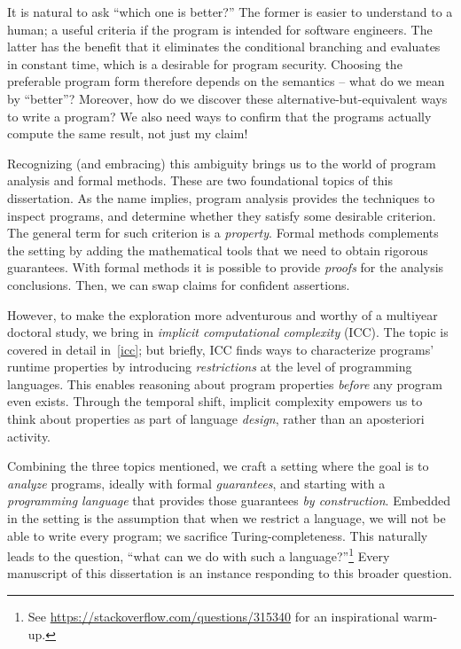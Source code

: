 It is natural to ask \enquote{which one is better?}
The former is {easier} to understand {to a human};
a useful criteria if the program is intended for software engineers.
The latter has the benefit that it eliminates the conditional branching and evaluates in {constant time}, which is a desirable for program security.
Choosing the preferable program form therefore depends on the semantics -- what do we mean by \enquote{better}?
Moreover, how do we discover these alternative-but-equivalent ways to write a program?
We also need ways to confirm that the programs {actually} compute the same result, not just my claim!
 
Recognizing (and {embracing}) this ambiguity brings us to the world of program analysis and formal methods.
These are two foundational topics of this dissertation.
As the name implies, program analysis provides the techniques to inspect programs, and determine whether they satisfy some desirable criterion.
The general term for such criterion is a \emph{property}.
Formal methods complements the setting by adding the mathematical tools that we need to obtain rigorous guarantees.
With formal methods it is possible to provide \emph{proofs} for the analysis conclusions. 
Then, we can swap claims for confident assertions.

However, to make the exploration more adventurous and worthy of a multiyear doctoral study, we bring in \emph{implicit computational complexity} (ICC).
The topic is covered in detail in~\autoref{icc};
but briefly, ICC finds ways to characterize programs' runtime properties by introducing \emph{restrictions} at the level of programming languages.
This enables reasoning about program properties \emph{before} any program even exists.
Through the temporal shift, implicit complexity empowers us to think about properties as part of language \emph{design}, rather than an aposteriori activity.

Combining the three topics mentioned, we craft a setting where the goal is to \emph{analyze} programs, ideally with formal \emph{guarantees}, and starting with a \emph{programming language} that provides those guarantees \emph{by construction}.
Embedded in the setting is the assumption that when we restrict a language, we will not be able to write every program;
\ie we sacrifice Turing-completeness.
This naturally leads to the question, \enquote{what can we do with such a language?}\footnote{
See \url{https://stackoverflow.com/questions/315340} for an inspirational warm-up.}
Every manuscript of this dissertation is an instance responding to this broader question.

